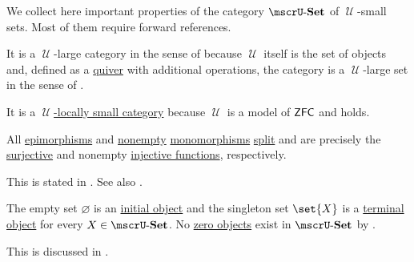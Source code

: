 \begin{proposition}\label{thm:category_of_small_sets_properites}
  We collect here important properties of the category \hyperref[def:category_of_small_sets]{\( \ucat{Set} \)} of \( \mscrU \)-small sets. Most of them require forward references.

  \begin{thmenum}
     It is a \( \mscrU \)-large category in the sense of  because \( \mscrU \) itself is the set of objects and, defined as a \hyperref[def:quiver]{quiver} with additional operations, the category is a \( \mscrU \)-large set in the sense of .

     It is a \hyperref[def:category_size]{\( \mscrU \)-locally small category} because \( \mscrU \) is a model of \hyperref[def:zfc]{\( \textsf{ZFC} \)} and  holds.

     All \hyperref[def:morphism_invertibility/right_cancellative]{epimorphisms} and \hyperref[def:multi_valued_function/empty]{nonempty} \hyperref[def:morphism_invertibility/left_cancellative]{monomorphisms} \hyperref[def:morphism_invertibility/left_invertible]{split} and are precisely the \hyperref[def:function_invertibility/surjective]{surjective} and nonempty \hyperref[def:function_invertibility/injective]{injective functions}, respectively.

    This is stated in . See also .

     The empty set \( \varnothing \) is an \hyperref[def:zero_objects/initial]{initial object} and the singleton set \( \set{ X } \) is a \hyperref[def:zero_objects/terminal]{terminal object} for every \( X \in \ucat{Set} \). No \hyperref[def:zero_objects/zero]{zero objects} exist in \( \ucat{Set} \) by .

    This is discussed in .
  \end{thmenum}
\end{proposition}

